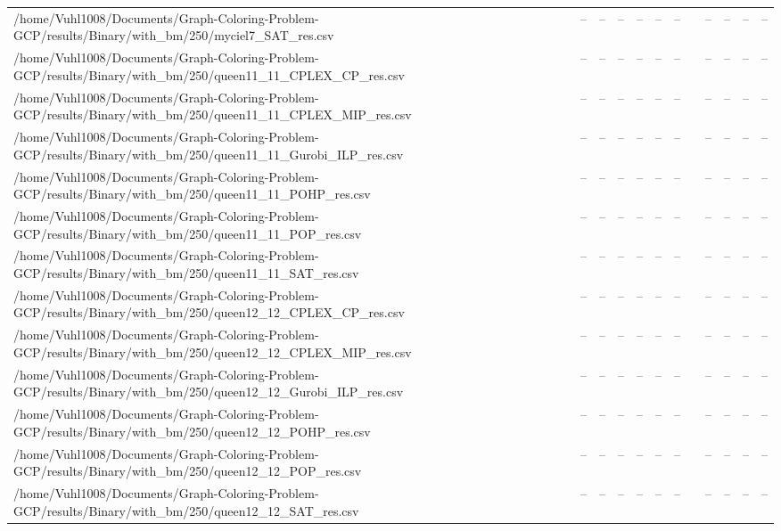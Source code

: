 \begin{table}[htbp]
\begin{tabular}{llllllllllll}
/home/Vuhl1008/Documents/Graph-Coloring-Problem-GCP/results/Binary/with\_bm/250/myciel7\_SAT\_res.csv & -- & -- & -- & -- & -- & -- & {} & -- & -- & -- & -- \\
/home/Vuhl1008/Documents/Graph-Coloring-Problem-GCP/results/Binary/with\_bm/250/queen11\_11\_CPLEX\_CP\_res.csv & -- & -- & -- & -- & -- & -- & {} & -- & -- & -- & -- \\
/home/Vuhl1008/Documents/Graph-Coloring-Problem-GCP/results/Binary/with\_bm/250/queen11\_11\_CPLEX\_MIP\_res.csv & -- & -- & -- & -- & -- & -- & {} & -- & -- & -- & -- \\
/home/Vuhl1008/Documents/Graph-Coloring-Problem-GCP/results/Binary/with\_bm/250/queen11\_11\_Gurobi\_ILP\_res.csv & -- & -- & -- & -- & -- & -- & {} & -- & -- & -- & -- \\
/home/Vuhl1008/Documents/Graph-Coloring-Problem-GCP/results/Binary/with\_bm/250/queen11\_11\_POHP\_res.csv & -- & -- & -- & -- & -- & -- & {} & -- & -- & -- & -- \\
/home/Vuhl1008/Documents/Graph-Coloring-Problem-GCP/results/Binary/with\_bm/250/queen11\_11\_POP\_res.csv & -- & -- & -- & -- & -- & -- & {} & -- & -- & -- & -- \\
/home/Vuhl1008/Documents/Graph-Coloring-Problem-GCP/results/Binary/with\_bm/250/queen11\_11\_SAT\_res.csv & -- & -- & -- & -- & -- & -- & {} & -- & -- & -- & -- \\
/home/Vuhl1008/Documents/Graph-Coloring-Problem-GCP/results/Binary/with\_bm/250/queen12\_12\_CPLEX\_CP\_res.csv & -- & -- & -- & -- & -- & -- & {} & -- & -- & -- & -- \\
/home/Vuhl1008/Documents/Graph-Coloring-Problem-GCP/results/Binary/with\_bm/250/queen12\_12\_CPLEX\_MIP\_res.csv & -- & -- & -- & -- & -- & -- & {} & -- & -- & -- & -- \\
/home/Vuhl1008/Documents/Graph-Coloring-Problem-GCP/results/Binary/with\_bm/250/queen12\_12\_Gurobi\_ILP\_res.csv & -- & -- & -- & -- & -- & -- & {} & -- & -- & -- & -- \\
/home/Vuhl1008/Documents/Graph-Coloring-Problem-GCP/results/Binary/with\_bm/250/queen12\_12\_POHP\_res.csv & -- & -- & -- & -- & -- & -- & {} & -- & -- & -- & -- \\
/home/Vuhl1008/Documents/Graph-Coloring-Problem-GCP/results/Binary/with\_bm/250/queen12\_12\_POP\_res.csv & -- & -- & -- & -- & -- & -- & {} & -- & -- & -- & -- \\
/home/Vuhl1008/Documents/Graph-Coloring-Problem-GCP/results/Binary/with\_bm/250/queen12\_12\_SAT\_res.csv & -- & -- & -- & -- & -- & -- & {} & -- & -- & -- & -- \\

\end{tabular}
\end{table}
